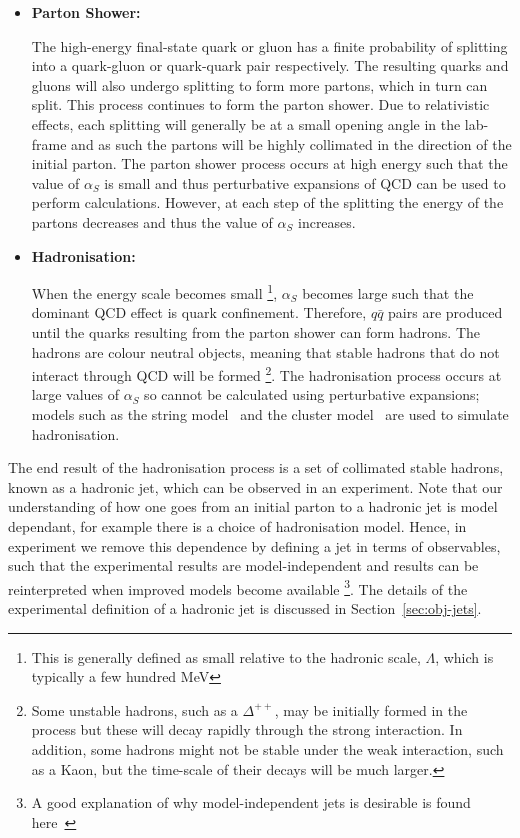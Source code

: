 \begin{itemize}[leftmargin=*]
  
\item\textbf{Parton Shower:}

  The high-energy final-state quark or gluon has a finite probability of splitting into a quark-gluon or quark-quark pair respectively.
  The resulting quarks and gluons will also undergo splitting to form more partons,
  which in turn can split. This process continues to form the parton shower.
  Due to relativistic effects, each splitting will generally be at a small opening angle in the lab-frame
  and as such the partons will be highly collimated in the direction of the initial parton.
  The parton shower process occurs at high energy such that the value of $\alpha_S$ is small
  and thus perturbative expansions of QCD can be used to perform calculations.
  However, at each step of the splitting the energy of the partons decreases
  and thus the value of $\alpha_S$ increases.\vspace{0.5em}
  
\item\textbf{Hadronisation:}
  
  When the energy scale becomes small
  \footnote{This is generally defined as small relative to the hadronic scale, $\Lambda$, which is typically a few hundred MeV},
  $\alpha_S$ becomes large such that the dominant QCD effect is quark confinement.
  Therefore, $q\bar{q}$ pairs are produced until the quarks resulting from the parton shower can form hadrons.
  The hadrons are colour neutral objects, meaning that stable hadrons that do not interact through QCD will be formed
  \footnote{Some unstable hadrons, such as a $\Delta^{++}$, may be initially formed in the process but these will decay rapidly through the strong interaction.
    In addition, some hadrons might not be stable under the weak interaction, such as a Kaon, but the time-scale of their decays will be much larger.}.
  The hadronisation process occurs at large values of $\alpha_S$ so cannot be calculated using perturbative expansions;
  models such as the string model~\cite{theo-qcd_jet_string} and the
  cluster model~\cite{theo-qcd_jet_cluster} are used to simulate hadronisation.

\end{itemize}
  
The end result of the hadronisation process is a set of collimated stable hadrons,
known as a hadronic jet, which can be observed in an experiment.
Note that our understanding of how one goes from an initial parton to a hadronic jet is model dependant,
for example there is a choice of hadronisation model.
Hence, in experiment we remove this dependence by defining a jet in terms of observables,
such that the experimental results are model-independent and results can be reinterpreted when improved models become available
\footnote{A good explanation of why model-independent jets is desirable is found here~\cite{theo-jets_jb}}.
The details of the experimental definition of a hadronic jet is discussed in Section~\ref{sec:obj-jets}.

